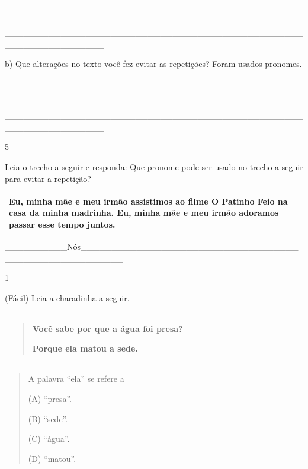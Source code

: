 \begin{escolha}
\begin{escolha}
{\_\_\_\_\_\_\_\_\_\_\_\_\_\_\_\_\_\_\_\_\_\_\_\_\_\_\_\_\_\_\_\_\_\_\_\_\_\_\_\_\_\_\_\_\_\_\_\_\_\_\_\_\_\_\_\_\_\_\_\_\_\_\_\_

\_\_\_\_\_\_\_\_\_\_\_\_\_\_\_\_\_\_\_\_\_\_\_\_\_\_\_\_\_\_\_\_\_\_\_\_\_\_\_\_\_\_\_\_\_\_\_\_\_\_\_\_\_\_\_\_\_\_\_\_\_\_\_\_

b) Que alterações no texto você fez evitar as repetições? Foram usados
pronomes.

\_\_\_\_\_\_\_\_\_\_\_\_\_\_\_\_\_\_\_\_\_\_\_\_\_\_\_\_\_\_\_\_\_\_\_\_\_\_\_\_\_\_\_\_\_\_\_\_\_\_\_\_\_\_\_\_\_\_\_\_\_\_\_\_

\_\_\_\_\_\_\_\_\_\_\_\_\_\_\_\_\_\_\_\_\_\_\_\_\_\_\_\_\_\_\_\_\_\_\_\_\_\_\_\_\_\_\_\_\_\_\_\_\_\_\_\_\_\_\_\_\_\_\_\_\_\_\_\_

\num{5}

Leia o trecho a seguir e responda: Que pronome pode ser usado no trecho
a seguir para evitar a repetição?

\begin{longtable}[]{@{}l@{}}
\toprule
Eu, minha mãe e meu irmão assistimos ao filme O Patinho Feio na casa da
minha madrinha. \textbf{Eu, minha mãe e meu irmão} adoramos passar esse
tempo juntos.\tabularnewline
\bottomrule
\end{longtable}

\_\_\_\_\_\_\_\_\_\_Nós\_\_\_\_\_\_\_\_\_\_\_\_\_\_\_\_\_\_\_\_\_\_\_\_\_\_\_\_\_\_\_\_\_\_\_\_\_\_\_\_\_\_\_\_\_\_\_\_\_\_\_\_\_\_


\num{1}

(Fácil) Leia a charadinha a seguir.

\begin{longtable}[]{@{}l@{}}
\toprule
\begin{minipage}[t]{0.97\columnwidth}\raggedright\strut
\begin{quote}
Você sabe por que a água foi presa?

Porque ela matou a sede.
\end{quote}\strut
\end{minipage}\tabularnewline
\bottomrule
\end{longtable}

\begin{quote}
A palavra ``ela'' se refere a

(A) ``presa''.

(B) ``sede''.

(C) ``água''.

(D) ``matou''.


\end{quote}}
\end{escolha}
\end{escolha}
